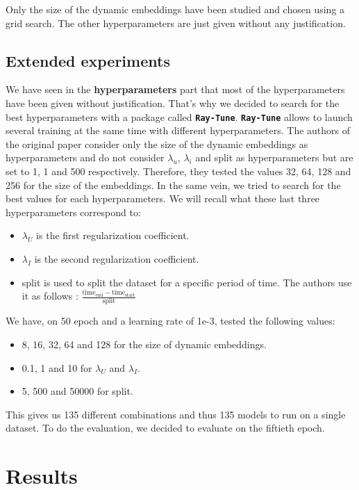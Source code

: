 Only the size of the dynamic embeddings have been studied and chosen using a grid search. The other hyperparameters are just given without any justification.



\subsection*{Extended experiments}

We have seen in the \textbf{hyperparameters} part that most of the hyperparameters have been given without justification. That's why we decided to search for the best hyperparameters with a package called \textbf{\texttt{Ray-Tune}}\supercite{liaw2018tune}. \textbf{\texttt{Ray-Tune}} allows to launch several training at the same time with different hyperparameters. The authors of the original paper consider only the size of the dynamic embeddings as hyperparameters and do not consider $\lambda_u$, $\lambda_i$ and split as hyperparameters but are set to 1, 1 and 500 respectively. Therefore, they tested the values 32, 64, 128 and 256 for the size of the embeddings. In the same vein, we tried to search for the best values for each hyperparameters. We will recall what these last three hyperparameters correspond to:
\begin{itemize}
    \item $\lambda_U$ is the first regularization coefficient.
    \item $\lambda_I$ is the second regularization coefficient.
    \item split is used to split the dataset for a specific period of time. The authors use it as follows : $\frac{\text{time}_{\text{end}} - \text{time}_{\text{start}}}{\text{split}}$
\end{itemize}
We have, on 50 epoch and a learning rate of 1e-3, tested the following values:
\begin{itemize}
    \item 8, 16, 32, 64 and 128 for the size of dynamic embeddings.
    \item 0.1, 1 and 10 for $\lambda_U$ and $\lambda_I$.
    \item 5, 500 and 50000 for split.
\end{itemize}
This gives us 135 different combinations and thus 135 models to run on a single dataset. To do the evaluation, we decided to evaluate on the fiftieth epoch.

\section*{Results}

